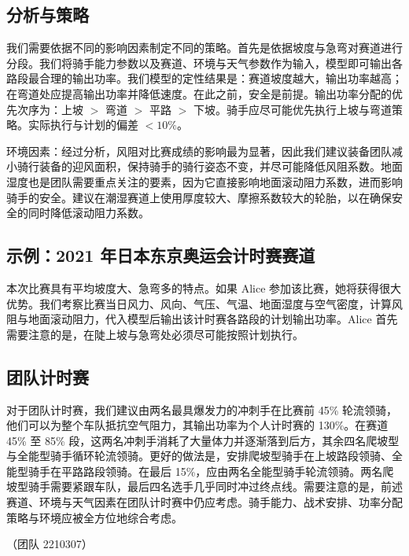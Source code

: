 \documentclass[11pt,a4paper]{ctexart}
\begin{document}
\subsection*{分析与策略}

我们需要依据不同的影响因素制定不同的策略。首先是依据坡度与急弯对赛道进行分段。我们将骑手能力参数以及赛道、环境与天气参数作为输入，模型即可输出各路段最合理的输出功率。我们模型的定性结果是：赛道坡度越大，输出功率越高；在弯道处应提高输出功率并降低速度。在此之前，安全是前提。输出功率分配的优先次序为：上坡 $>$ 弯道 $>$ 平路 $>$ 下坡。骑手应尽可能优先执行上坡与弯道策略。实际执行与计划的偏差 $<10\%$。

环境因素：经过分析，风阻对比赛成绩的影响最为显著，因此我们建议装备团队减小骑行装备的迎风面积，保持骑手的骑行姿态不变，并尽可能降低风阻系数。地面湿度也是团队需要重点关注的要素，因为它直接影响地面滚动阻力系数，进而影响骑手的安全。建议在潮湿赛道上使用厚度较大、摩擦系数较大的轮胎，以在确保安全的同时降低滚动阻力系数。

\subsection*{示例：2021 年日本东京奥运会计时赛赛道}

本次比赛具有平均坡度大、急弯多的特点。如果 Alice 参加该比赛，她将获得很大优势。我们考察比赛当日风力、风向、气压、气温、地面湿度与空气密度，计算风阻与地面滚动阻力，代入模型后输出该计时赛各路段的计划输出功率。Alice 首先需要注意的是，在陡上坡与急弯处必须尽可能按照计划执行。

\subsection*{团队计时赛}

对于团队计时赛，我们建议由两名最具爆发力的冲刺手在比赛前 45\% 轮流领骑，他们可以为整个车队抵抗空气阻力，其输出功率为个人计时赛的 130\%。在赛道 45\% 至 85\% 段，这两名冲刺手消耗了大量体力并逐渐落到后方，其余四名爬坡型与全能型骑手循环轮流领骑。更好的做法是，安排爬坡型骑手在上坡路段领骑、全能型骑手在平路路段领骑。在最后 15\%，应由两名全能型骑手轮流领骑。两名爬坡型骑手需要紧跟车队，最后四名选手几乎同时冲过终点线。需要注意的是，前述赛道、环境与天气因素在团队计时赛中仍应考虑。骑手能力、战术安排、功率分配策略与环境应被全方位地综合考虑。

（团队 2210307）
\end{document}
